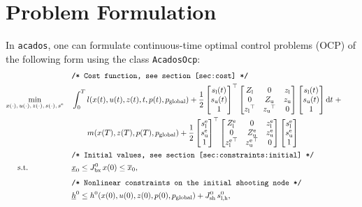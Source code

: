 \documentclass[english]{article}
\newcommand{\acados}{\texttt{acados}}
\newcommand{\tran}{^\top}
\newcommand{\ind}[1]{_{\textrm{#1}}}
\newcommand{\terminal}{^{\textrm{e}}}
\newcommand{\initial}{^{\textrm{0}}}
\newcommand{\matr}[1]{\begin{bmatrix}#1\end{bmatrix}}
\newcommand{\glob}{_{\textrm{global}}}
\newcommand{\Lower}{\ind{l}}
\newcommand{\lowerh}{\ind{l,h}}
\newcommand{\upper}{\ind{u}}
\newcommand{\mathComment}[1]{\texttt{/* #1 */}}
\begin{document}
%
\section{Problem Formulation}\label{sec:problem}
%
In \acados{}, one can formulate continuous-time optimal control problems (OCP) of the following form using the class \texttt{AcadosOcp}:
%
\begin{align}
    &&&\mathComment{Cost function, see section \ref{sec:cost}}\nonumber\\
    &\underset{\begin{subarray}{c}
        x(\cdot),\,u(\cdot), \, z(\cdot), \, s(\cdot), \, s\terminal
        \end{subarray}}{\min}
    &&\int_0^T l(x(t), u(t), z(t), t, p(t), p\glob)
     + \frac{1}{2} \matr{s\Lower(t) \\ s\upper(t) \\ 1} \tran
      \matr{ Z\Lower & 0 & z\Lower \\
      0 & Z\upper & z\upper \\
        {z\Lower}\tran & {z\upper}\tran & 0}
    \matr{s\Lower(t) \\ s\upper(t) \\ 1} \mathrm{d}t \; + \nonumber\\
     &&& \quad \quad m(x(T), z(T), p(T), p\glob) +
      \frac{1}{2} \matr{s\Lower\terminal \\ s\upper\terminal \\ 1} \tran
     \matr{ Z\Lower\terminal & 0 & z\Lower\terminal \\
         0 & Z\upper\terminal & z\upper\terminal \\
         {z\Lower\terminal}\tran & {z\upper\terminal}\tran & 0}
     \matr{s\Lower\terminal \\ s\upper\terminal \\ 1}
     \label{eq:cost}\\
    &&&\mathComment{Initial values, see section \ref{sec:constraints:initial}}\nonumber\\
    &\,\,\,\quad \text{s.t.}    &&\underline{x}_0 \leq J\ind{bx}\initial \, x(0) \leq \overline{x}_0 , && \label{eq:constraints:initial}\\[1ex]
    &&&\mathComment{Nonlinear constraints on the initial shooting node} \nonumber\\
    &&&\underline{h}\initial \leq h\initial(x(0), u(0), z(0), p(0), p\glob) + J_{\textrm{sh}}\initial \, s\lowerh\initial, &&\label{eq:constraints:path:lower_bounds:start}\\

\end{align}
\end{document}
